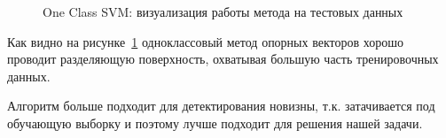 \documentclass[12pt]{article}
\begin{document}
    \begin{figure}[h!]
        \centering
        \caption{One Class SVM: визуализация работы метода на тестовых данных}
        \label{sec:Research:Model:Visualization:fig:OneClassSVM}
    \end{figure}

    \par Как видно на рисунке~\ref{sec:Research:Model:Visualization:fig:OneClassSVM} одноклассовый метод опорных векторов хорошо проводит разделяющую поверхность, охватывая большую часть тренировочных данных.

    \par Алгоритм больше подходит для детектирования новизны, т.к. затачивается под обучающую выборку и поэтому лучше подходит для решения нашей задачи.
\end{document}
